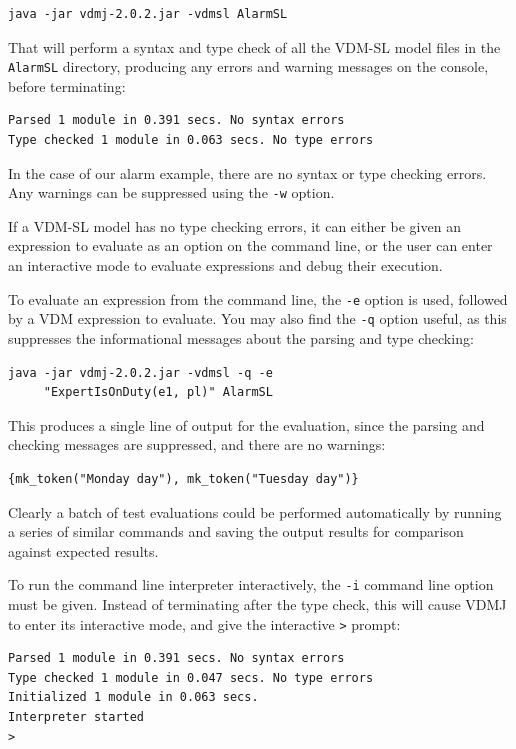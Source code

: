 \begin{lstlisting}
java -jar vdmj-2.0.2.jar -vdmsl AlarmSL
\end{lstlisting}

\noindent That will perform a syntax and type check of all the
VDM-SL model files in the \texttt{AlarmSL} directory, producing any errors and
warning messages on the console, before terminating:

\begin{lstlisting}
Parsed 1 module in 0.391 secs. No syntax errors
Type checked 1 module in 0.063 secs. No type errors
\end{lstlisting}

\noindent In the case of our alarm example, there are no syntax or
type checking errors. Any warnings can be suppressed using the
\verb|-w| option.

If a VDM-SL model has no type checking errors, it can either be given
an expression to evaluate as an option on the command line, or the
user can enter an interactive mode to evaluate expressions and debug
their execution.

To evaluate an expression from the command line, the \verb|-e| option
is used, followed by a VDM expression to evaluate. You may also find
the \verb|-q| option useful, as this suppresses the informational
messages about the parsing and type checking:

\begin{lstlisting}
java -jar vdmj-2.0.2.jar -vdmsl -q -e 
     "ExpertIsOnDuty(e1, pl)" AlarmSL
\end{lstlisting}

\noindent This produces a single line of output for the evaluation,
since the parsing and checking messages are suppressed, and there are
no warnings:

\begin{lstlisting}
{mk_token("Monday day"), mk_token("Tuesday day")}
\end{lstlisting}

Clearly a batch of test evaluations could be performed automatically
by running a series of similar commands and saving the output results
for comparison against expected results.

To run the command line interpreter interactively, the \verb|-i|
command line option must be given. Instead of terminating after the
type check, this will cause VDMJ to enter its interactive mode, and
give the interactive \verb|>| prompt:

\begin{lstlisting}
Parsed 1 module in 0.391 secs. No syntax errors
Type checked 1 module in 0.047 secs. No type errors
Initialized 1 module in 0.063 secs. 
Interpreter started
>
\end{lstlisting}

